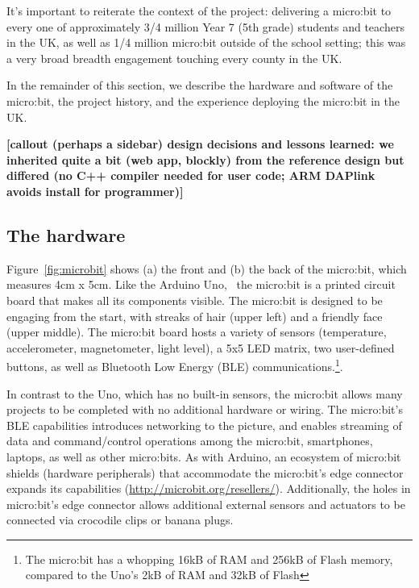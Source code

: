 It's important to reiterate the context of the project: 
delivering a micro:bit to every one of 
approximately 3/4 million Year 7 (5th grade) students and teachers in the UK, as
well as 1/4 million micro:bit outside of the school setting; this was a very
broad breadth engagement touching every county in the UK.

In the remainder of this section, we describe the hardware and software
of the micro:bit, the project history, and the experience deploying
the micro:bit in the UK. 

{\bf [callout (perhaps a sidebar) design decisions and
lessons learned: we inherited quite a bit (web app, blockly) from the reference
design but differed
(no C++ compiler needed for user code; ARM DAPlink avoids install for programmer)]}

\subsection{The hardware}

Figure~\ref{fig:microbit} shows (a) the front and (b) the back of the
micro:bit, which measures 4cm x 5cm. Like the Arduino Uno,~\cite{ArduinoUno}
the micro:bit is a printed circuit board that makes all its components visible.  
The micro:bit is designed to be engaging from the start, 
with streaks of hair (upper left) and a friendly face (upper middle).
The micro:bit board hosts a variety of sensors (temperature, accelerometer, magnetometer,
light level), a 5x5 LED matrix, two user-defined buttons, as well as Bluetooth
Low Energy (BLE) communications.\footnote{The micro:bit has a whopping
16kB of RAM and 256kB of Flash memory, compared to the Uno's 2kB of
RAM and 32kB of Flash}. 

In contrast to the Uno, which has no built-in sensors, the micro:bit
allows many projects to be completed with no additional hardware or wiring.
The micro:bit's BLE capabilities introduces networking to the
picture, and enables streaming of data and command/control operations among the micro:bit,
smartphones, laptops, as well as other micro:bits.
As with Arduino, an ecosystem of micro:bit shields
(hardware peripherals) that accommodate the micro:bit's edge
connector expands its capabilities (\url{http://microbit.org/resellers/}).
Additionally, the holes in micro:bit's edge connector allows additional external sensors 
and actuators to be connected via crocodile clips or banana plugs.

